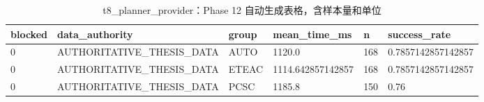 \begin{table}[htbp]
\centering
\caption{t8_planner_provider：Phase 12 自动生成表格，含样本量和单位}
\begin{tabular}{llllll}
\hline
blocked & data_authority & group & mean_time_ms & n & success_rate \\
\hline
0 & AUTHORITATIVE\_THESIS\_DATA & AUTO & 1120.0 & 168 & 0.7857142857142857 \\
0 & AUTHORITATIVE\_THESIS\_DATA & ETEAC & 1114.642857142857 & 168 & 0.7857142857142857 \\
0 & AUTHORITATIVE\_THESIS\_DATA & PCSC & 1185.8 & 150 & 0.76 \\
\hline
\end{tabular}
\end{table}
